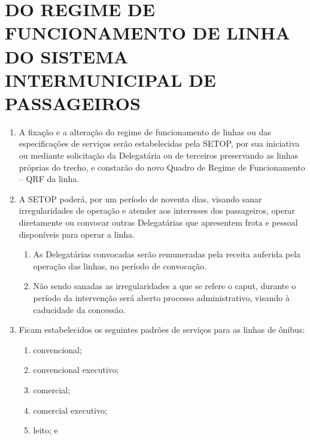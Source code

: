 \chapter{DO REGIME DE FUNCIONAMENTO DE LINHA DO SISTEMA INTERMUNICIPAL DE PASSAGEIROS}

\begin{enumerate}[resume, label=Art. \arabic*]

\item A fixação e a alteração do regime de funcionamento de linhas ou das especificações de serviços serão estabelecidas pela SETOP, por sua iniciativa ou mediante solicitação da Delegatária ou de terceiros preservando as linhas próprias do trecho, e constarão do novo Quadro de Regime de Funcionamento – QRF da linha.

\item A SETOP poderá, por um período de noventa dias, visando sanar irregularidades de operação e atender aos interesses dos passageiros, operar diretamente ou convocar outras Delegatárias que apresentem frota e pessoal disponíveis para operar a linha.

\begin{enumerate}[label= \S \arabic*] %

\item As Delegatárias convocadas serão remuneradas pela receita auferida pela operação das linhas, no período de convocação.

\item Não sendo sanadas as irregularidades a que se refere o caput, durante o período da intervenção será aberto processo administrativo, visando à caducidade da concessão.

\end{enumerate}

\item Ficam estabelecidos os seguintes padrões de serviços para as linhas de ônibus:

\begin{enumerate}[label=\roman*.]

\item convencional;

\item convencional executivo;

\item comercial;

\item comercial executivo;

\item leito; e


\end{enumerate}
\end{enumerate}
